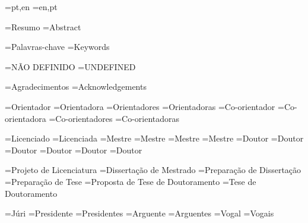 \UNL@abstractorder[pt]={pt,en}
\UNL@abstractorder[en]={en,pt}



\UNL@abstractname[pt]={Resumo}
\UNL@abstractname[en]={Abstract}

\UNL@keywordsname[pt]={Palavras-chave}
\UNL@keywordsname[en]={Keywords}

\UNL@notdefined[pt]={NÃO DEFINIDO}
\UNL@notdefined[en]={UNDEFINED}

\UNL@acknowledgementsname[pt]={Agradecimentos}
\UNL@acknowledgementsname[en]={Acknowledgements}


\UNL@adviserstr[1,m,pt]={Orientador}
\UNL@adviserstr[1,f,pt]={Orientadora}
\UNL@adviserstr[2,m,pt]={Orientadores}
\UNL@adviserstr[2,f,pt]={Orientadoras}
\UNL@coadviserstr[1,m,pt]={Co-orientador}
\UNL@coadviserstr[1,f,pt]={Co-orientadora}
\UNL@coadviserstr[2,m,pt]={Co-orientadores}
\UNL@coadviserstr[2,f,pt]={Co-orientadoras}

\UNL@degreestr[bsc,m,pt]={Licenciado}
\UNL@degreestr[bsc,f,pt]={Licenciada}
\UNL@degreestr[msc,m,pt]={Mestre}
\UNL@degreestr[msc,f,pt]={Mestre}
\UNL@degreestr[prepmsc,m,pt]={Mestre}
\UNL@degreestr[prepmsc,f,pt]={Mestre}
\UNL@degreestr[phd,m,pt]={Doutor}
\UNL@degreestr[phd,f,pt]={Doutor}
\UNL@degreestr[prepphd,m,pt]={Doutor}
\UNL@degreestr[prepphd,f,pt]={Doutor}
\UNL@degreestr[propphd,m,pt]={Doutor}
\UNL@degreestr[propphd,f,pt]={Doutor}

\UNL@doctypestr[bsc,pt]={Projeto de Licenciatura}
\UNL@doctypestr[msc,pt]={Dissertação de Mestrado}
\UNL@doctypestr[prepmsc,pt]={Preparação de Dissertação}
\UNL@doctypestr[prepphd,pt]={Preparação de Tese}
\UNL@doctypestr[phd,pt]={Proposta de Tese de Doutoramento}
\UNL@doctypestr[propphd,pt]={Tese de Doutoramento}

\UNL@jurytitlestr[pt]={Júri}
\UNL@presidentstr[1,pt]={Presidente}
\UNL@presidentstr[2,pt]={Presidentes}
\UNL@refereestr[1,pt]={Arguente}
\UNL@refereestr[2,pt]={Arguentes}
\UNL@memberstr[1,pt]={Vogal}
\UNL@memberstr[2,pt]={Vogais}

